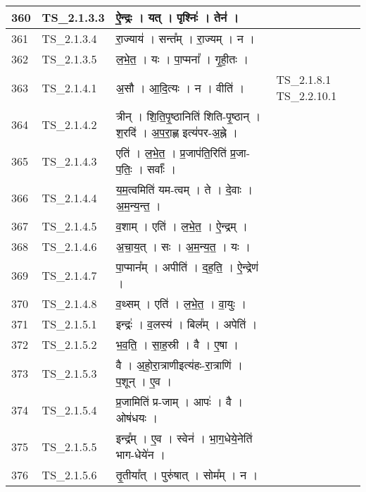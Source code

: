 \documentclass[17pt]{extarticle}
\begin{document}
\begin{longtable}{||p{0.4in}||p{0.9in}||p{4.0in}||p{0.9in}||}
        \hline
            360 & TS\_2.1.3.3 & ऐ॒न्द्रः   ।   यत्   ।   पृश्निः॑   ।   तेन॑   ।    &      \\
        \hline
            361 & TS\_2.1.3.4 & रा॒ज्याय॑   ।   सन्त᳚म्   ।   रा॒ज्यम्   ।   न   ।    &      \\
        \hline
            362 & TS\_2.1.3.5 & ल॒भे॒त॒   ।   यः   ।   पा॒प्मना᳚   ।   गृ॒ही॒तः   ।    &      \\
        \hline
            363 & TS\_2.1.4.1 & अ॒सौ   ।   आ॒दि॒त्यः   ।   न   ।   वीति॑   ।    &  TS\_2.1.8.1 TS\_2.2.10.1       \\
        \hline
            364 & TS\_2.1.4.2 & त्रीन्   ।   शि॒ति॒पृ॒ष्ठानिति॑ शिति{-}पृ॒ष्ठान्   ।   श॒रदि॑   ।   अ॒प॒रा॒ह्ण इत्य॑पर{-}अ॒ह्ने   ।    &      \\
        \hline
            365 & TS\_2.1.4.3 & एति॑   ।   ल॒भे॒त॒   ।   प्र॒जाप॑ति॒रिति॑ प्र॒जा{-}प॒तिः॒   ।   सर्वाः᳚   ।    &      \\
        \hline
            366 & TS\_2.1.4.4 & य॒म॒त्वमिति॑ यम{-}त्वम्   ।   ते   ।   दे॒वाः   ।   अ॒म॒न्य॒न्त॒   ।    &      \\
        \hline
            367 & TS\_2.1.4.5 & व॒शाम्   ।   एति॑   ।   ल॒भे॒त॒   ।   ऐ॒न्द्रम्   ।    &      \\
        \hline
            368 & TS\_2.1.4.6 & अ॒चा॒य॒त्   ।   सः   ।   अ॒म॒न्य॒त॒   ।   यः   ।    &      \\
        \hline
            369 & TS\_2.1.4.7 & पा॒प्मान᳚म्   ।   अपीति॑   ।   द॒ह॒ति॒   ।   ऐ॒न्द्रेण॑   ।    &      \\
        \hline
            370 & TS\_2.1.4.8 & व॒थ्सम्   ।   एति॑   ।   ल॒भे॒त॒   ।   वा॒युः   ।    &      \\
        \hline
            371 & TS\_2.1.5.1 & इन्द्रः॑   ।   व॒लस्य॑   ।   बिल᳚म्   ।   अपेति॑   ।    &      \\
        \hline
            372 & TS\_2.1.5.2 & भ॒व॒ति॒   ।   सा॒ह॒स्री   ।   वै   ।   ए॒षा   ।    &      \\
        \hline
            373 & TS\_2.1.5.3 & वै   ।   अ॒हो॒रा॒त्राणीइत्य॑हः{-}रा॒त्राणि॑   ।   प॒शून्   ।   ए॒व   ।    &      \\
        \hline
            374 & TS\_2.1.5.4 & प्र॒जामिति॑ प्र{-}जाम्   ।   आपः॑   ।   वै   ।   ओष॑धयः   ।    &      \\
        \hline
            375 & TS\_2.1.5.5 & इन्द्र᳚म्   ।   ए॒व   ।   स्वेन॑   ।   भा॒ग॒धेये॒नेति॑ भाग{-}धेये॑न   ।    &      \\
        \hline
            376 & TS\_2.1.5.6 & तृ॒तीया᳚त्   ।   पुरु॑षात्   ।   सोम᳚म्   ।   न   ।    &      \\

\end{longtable}
\end{document}
